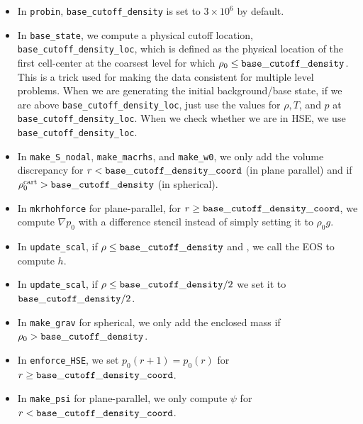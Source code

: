 \begin{itemize}

\item In {\tt probin}, {\tt base\_cutoff\_density} is set to $3\times 10^6$ by default.

\item In {\tt base\_state}, we compute a physical cutoff location,
  {\tt base\_cutoff\_density\_loc}, which is defined as the physical
  location of the first cell-center at the coarsest level for which
  $\rho_0 \le {\tt base\_cutoff\_density}$.  This is a trick used for making
  the data consistent for multiple level problems.  When we are generating the 
  initial background/base state, if we are above {\tt base\_cutoff\_density\_loc}, 
  just use the values for $\rho,T$, and $p$ at {\tt base\_cutoff\_density\_loc}.
  When we check whether we are in HSE, we use {\tt base\_cutoff\_density\_loc}.

\item In {\tt make\_S\_nodal}, {\tt make\_macrhs}, and {\tt make\_w0}, 
  we only add the volume discrepancy for $r < {\tt base\_cutoff\_density\_coord}$
  (in plane parallel) and if $\rho_0^{\rm cart} > {\tt base\_cutoff\_density}$ 
  (in spherical).

\item In {\tt mkrhohforce} for plane-parallel, for
  $r \ge {\tt base\_cutoff\_density\_coord}$, we
  compute $\nabla p_0$ with a difference stencil instead of simply
  setting it to $\rho_0 g$.

\item In {\tt update\_scal}, if $\rho \le {\tt base\_cutoff\_density}$
   and , we call the EOS to compute $h$.

\item In {\tt update\_scal}, if $\rho \le {\tt base\_cutoff\_density}/2$
   we set it to ${\tt base\_cutoff\_density}/2$.

\item In {\tt make\_grav} for spherical, we only add the enclosed mass if
  $\rho_0 > {\tt base\_cutoff\_density}$.

\item In {\tt enforce\_HSE}, we set $p_0(r+1) = p_0(r)$ for 
  $r \ge {\tt base\_cutoff\_density\_coord}$.

\item In {\tt make\_psi} for plane-parallel, we only compute $\psi$ for 
  $r < {\tt base\_cutoff\_density\_coord}$.

\end{itemize}

